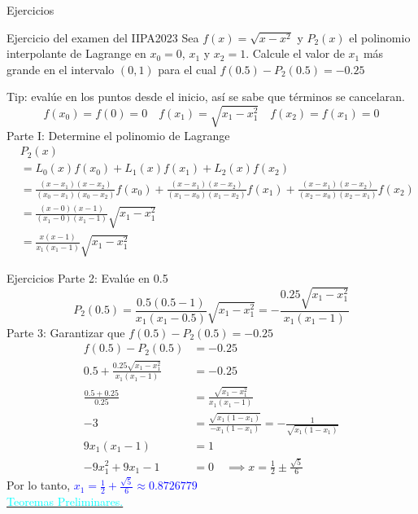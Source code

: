 \begin{frame}{Ejercicios}
\label{PolinomioLagrange}
\begin{block}{Ejercicio del examen del IIPA2023}
Sea $f(x)=\sqrt{x-x^2}$ y $P_2(x)$ el polinomio interpolante de Lagrange en $x_0=0$, $x_1$ y $x_2=1$. Calcule el valor de $x_1$ más grande en el intervalo $(0,1)$ para el cual $f(0.5)-P_2(0.5)=-0.25$ 
\end{block}
\small
Tip: evalúe en los puntos desde el inicio, así se sabe que términos se cancelaran.
$$f(x_0)=f(0)=0 \quad f(x_1)=\sqrt{x_1-x_1^2}\quad f(x_2)=f(x_1)=0$$
Parte I: Determine el polinomio de Lagrange
\begin{align*}
&P_2(x)\\
&=L_0(x)f(x_0)+L_1(x)f(x_1)+L_2(x)f(x_2)\\
&=\frac{(x-x_1)(x-x_2)}{(x_0-x_1)(x_0-x_2)}f(x_0)+\frac{(x-x_1)(x-x_2)}{(x_1-x_0)(x_1-x_2)}f(x_1)+\frac{(x-x_1)(x-x_2)}{(x_2-x_0)(x_2-x_1)}f(x_2)\\
&=\frac{(x-0)(x-1)}{(x_1-0)(x_1-1)}\sqrt{x_1-x_1^2}\\
&=\frac{x(x-1)}{x_1(x_1-1)}\sqrt{x_1-x_1^2}
\end{align*}
\end{frame}
\begin{frame}{Ejercicios}
\small
Parte 2: Evalúe en 0.5
$$P_2(0.5)=\frac{0.5(0.5-1)}{x_1(x_1-0.5)}\sqrt{x_1-x_1^2}=-\frac{0.25\sqrt{x_1-x_1^2}}{x_1(x_1-1)}$$
Parte 3: Garantizar que $f(0.5)-P_2(0.5)=-0.25$ 
\begin{align*}
f(0.5)-P_2(0.5)&=-0.25\\
0.5+\frac{0.25\sqrt{x_1-x_1^2}}{x_1(x_1-1)}&=-0.25\\
\frac{0.5+0.25}{0.25}&=\frac{\sqrt{x_1-x_1^2}}{x_1(x_1-1)}\\
-3&=\frac{\sqrt{x_1(1-x_1)}}{-x_1(1-x_1)}=-\frac{1}{\sqrt{x_1(1-x_1)}}\\
9x_1(x_1-1)&=1\\
-9x_1^2+9x_1-1&=0 \quad \implies x=\frac{1}{2}\pm\frac{\sqrt{5}}{6}
\end{align*}
Por lo tanto, \textcolor{blue}{$x_1=\frac{1}{2}+\frac{\sqrt{5}}{6}\approx 0.8726779$\\} 
\hyperlink{RetornoPolinomioLagrange}{\textcolor{cyan}{Teoremas Preliminares.}}
\end{frame}

